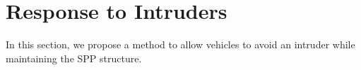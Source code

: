 \section{Response to Intruders \label{sec:intruder}}
In this section, we propose a method to allow vehicles to avoid an intruder while maintaining the SPP structure.
%
%
%
%
%
%

